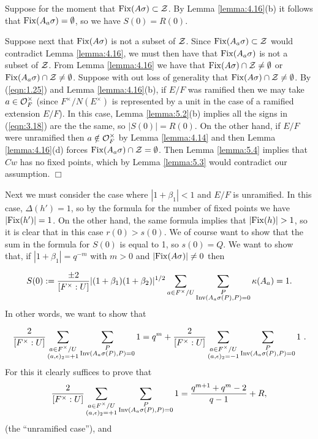 \documentclass[12pt,letterpaper]{article}
\def\zz{{\cal Z}}
\def\qed{$\Box$}
\def\off{{\cal O}_F}
\begin{document}
Suppose for the moment that ${\rm Fix}(A\sigma ) \subset \zz$.
By Lemma \ref{lemma:4.16}(b) 
it follows that ${\rm Fix}(A_a\sigma ) =\emptyset $,
so we have $S(0) = R(0)$.
 
Suppose next that ${\rm Fix}(A\sigma )$ is not a subset of $\zz$. Since
${\rm Fix}(A_a\sigma ) \subset \zz$ 
would contradict Lemma \ref{lemma:4.16},
we must then have that ${\rm Fix}(A_a\sigma )$ is not a subset
of $\zz$. 
From Lemma \ref{lemma:4.16} 
we have that ${\rm Fix}(A\sigma ) \cap \zz \not= \emptyset$
or ${\rm Fix}(A_a\sigma ) \cap \zz \not= \emptyset$. Suppose with out loss of 
generality that 
${\rm Fix}(A\sigma ) \cap \zz \not= \emptyset$. 
By (\ref{eqn:1.25}) and 
Lemma \ref{lemma:4.16}(b), if $E/F$ was 
ramified then we may take $a\in \off^{\times}$
(since $F^{\times}/N(E^{\times})$ is represented by a unit in the
case of a ramified extension $E/F$).
In this case, Lemma \ref{lemma:5.2}(b) implies all the signs in 
(\ref{eqn:3.18}) are
the the same, so $|S(0)|=R(0)$. On the other hand, if $E/F$ were
unramified then $a\notin \off^{\times}$ by 
Lemma \ref{lemma:4.14} and then
Lemma \ref{lemma:4.16}(d) forces ${\rm Fix}(A_a\sigma ) \cap \zz = \emptyset$.
Then Lemma \ref{lemma:5.4} implies that $Cw$ has no fixed points, which
by Lemma \ref{lemma:5.3} would contradict our assumption.
\qed

Next we must consider the case where $|1+\beta_1|<1$ and $E/F$ is unramified.
In this case, $\Delta (h') = 1$, so by the formula for the number of fixed
points we have $|{\rm Fix}(h')| = 1$. On the other hand, the same formula
implies that $|{\rm Fix}(h)| > 1$, so it is clear that in this case
$r(0) > s(0)$. We of course want to show that the sum in the
formula for $S(0)$ is equal to 1, so $s(0) = Q$. We want to show that,
if $|1+\beta_1| = q^{-m}$ with $m>0$ and $|{\rm Fix}(A\sigma )|\not= 0$
then

\begin{equation}
S(0):={\pm 2\over{[F^{\times}:U]}}|(1+\beta_1)(1+\beta_2)|^{1/2}
\sum_{a\in F^{\times}/U}
\sum_{\substack{ P\\ {\rm Inv}(A_a\sigma (P),P) = 0}}
\kappa (A_a) = 1.
\label{eqn:5.10}
\end{equation}
In other words, we want to show that

\begin{equation}
{2\over{[F^{\times}:U]}}
\sum_{\substack{ a\in F^{\times}/U\\ (a,\epsilon)_2 =+1}}
\sum_{\substack{ P\\ {\rm Inv}(A_a\sigma (P),P) = 0}} 1
= q^m + {2\over{[F^{\times}:U]}}
\sum_{\substack{ a\in F^{\times}/U\\ (a,\epsilon)_2=-1}}
\sum_{\substack{ P\\ {\rm Inv}(A_a\sigma (P),P) = 0}} 1\ .
\label{eqn:5.11}
\end{equation}
For this it clearly suffices to prove that
\begin{equation}
{2\over{[F^{\times}:U]}}
\sum_{\substack{ a\in F^{\times}/U\\ (a,\epsilon)_2 =+1 }}
\sum_{\substack{ P\\ {\rm Inv}(A_a\sigma (P),P) = 0 }} 1
={{q^{m+1}+q^m-2}\over{q-1}}+R,
\label{eqn:5.12}
\end{equation}
(the ``unramified case''), and
\end{document}

